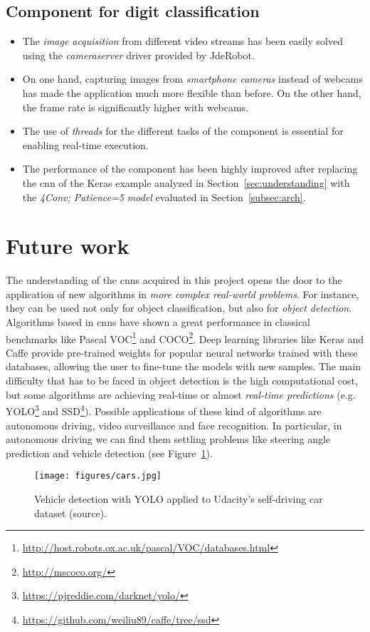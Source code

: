 \subsection*{Component for digit classification}
\begin{itemize}
	\item The \emph{image acquisition} from different video streams has been easily solved using the \textit{cameraserver} driver provided by JdeRobot.
	\item On one hand, capturing images from \emph{smartphone cameras} instead of webcams has made the application much more flexible than before. On the other hand, the frame rate is significantly higher with webcams.
	\item The use of \emph{threads} for the different tasks of the component is essential for enabling real-time execution.
	\item The performance of the component has been highly improved after replacing the \gls{cnn} of the Keras example analyzed in Section~\ref{sec:understanding} with the \emph{\textit{4Conv; Patience=5} model} evaluated in Section~\ref{subsec:arch}.
\end{itemize}

\section{Future work}
The understanding of the \glspl{cnn} acquired in this project opens the door to the application of new algorithms in \emph{more complex real-world problems}. For instance, they can be used not only for object classification, but also for \emph{object detection}. Algorithms based in \glspl{cnn} have shown a great performance in classical benchmarks like Pascal VOC\footnote{\url{http://host.robots.ox.ac.uk/pascal/VOC/databases.html}} and COCO\footnote{\url{http://mscoco.org/}}. Deep learning libraries like Keras and Caffe provide pre-trained weights for popular neural networks trained with these databases, allowing the user to fine-tune the models with new samples. The main difficulty that has to be faced in object detection is the high computational cost, but some algorithms are achieving real-time or almost \emph{real-time predictions} (e.g. YOLO\footnote{\url{https://pjreddie.com/darknet/yolo/}} and SSD\footnote{\url{https://github.com/weiliu89/caffe/tree/ssd}}). Possible applications of these kind of algorithms are autonomous driving, video surveillance and face recognition. In particular, in autonomous driving we can find them settling problems like steering angle prediction and vehicle detection (see Figure~\ref{fig:vehicle}).
\begin{figure}
	\centering
	\texttt{[image: figures/cars.jpg]}
	\caption{Vehicle detection with YOLO applied to Udacity's self-driving car dataset (source\cite{udacity}).}
	\label{fig:vehicle}
\end{figure}

